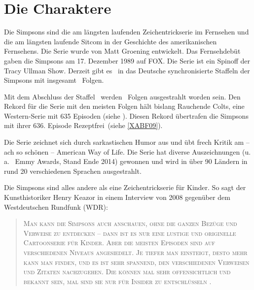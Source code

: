 \chapter{Die Charaktere}\label{Charaktere}

Die Simpsons sind die am längsten laufenden Zeichentrickserie im Fernsehen und die am längsten laufende Sitcom in der Geschichte des amerikanischen Fernsehens. Die Serie wurde von Matt Groening entwickelt. Das Fernsehdebüt gaben die Simpsons am 17. Dezember 1989 auf FOX. Die Serie ist ein Spinoff der \glqq Tracy Ullman Show\grqq . Derzeit gibt es \staffelAnzahl\ in das Deutsche synchronisierte Staffeln der Simpsons mit insgesamt \episodenAnzahl\ Folgen.

Mit dem Abschluss der Staffel \staffelAnzahl\ werden \episodenAnzahl\ Folgen ausgestrahlt worden sein. Den Rekord für die Serie mit den meisten Folgen hält bislang \glqq Rauchende Colts\grqq , eine Western-Serie mit 635 Episoden (siehe \cite{Serienrekord}). Diesen Rekord übertrafen die Simpsons mit ihrer 636. Episode \glqq Rezeptfrei\grqq\ (siehe \ref{XABF09}).

Die Serie zeichnet sich durch sarkastischen Humor aus und übt frech Kritik am -- ach so schönen -- \glqq American Way of Life\grqq . Die Serie hat diverse Auszeichnungen (u.\,a. \emmyAnzahl\ Emmy Awards, Stand Ende 2014) gewonnen und wird in über 90 Ländern in rund 20 verschiedenen Sprachen ausgestrahlt.

Die Simpsons sind alles andere als eine Zeichentrickserie für Kinder. So sagt der Kunsthistoriker Henry Keazor in einem Interview von 2008 gegenüber dem Westdeutschen Rundfunk (WDR):
\begin{quotation}
\scshape
\glqq Man kann die Simpsons auch anschauen, ohne die ganzen Be\-zü\-ge und Verweise zu entdecken -- dann ist es nur eine lustige und originelle Cartoonserie für Kinder. Aber die meisten Episoden sind auf verschiedenen Niveaus angesiedelt. Je tiefer man einsteigt, desto mehr kann man finden, und es ist sehr spannend, den verschiedenen Verweisen und Zitaten nachzugehen. Die können mal sehr offensichtlich und bekannt sein, mal sind sie nur für Insider zu entschlüsseln \cite{HenryKeazor}\grqq .
\end{quotation}

